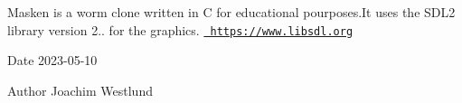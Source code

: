 Masken is a worm clone written in C for educational pourposes.\+It uses the S\+D\+L2 library version 2.. for the graphics. \href{https://www.libsdl.org}{\texttt{ https\+://www.\+libsdl.\+org}}

\begin{DoxyDate}{Date}
2023-\/05-\/10 
\end{DoxyDate}
\begin{DoxyAuthor}{Author}
Joachim Westlund 
\end{DoxyAuthor}
